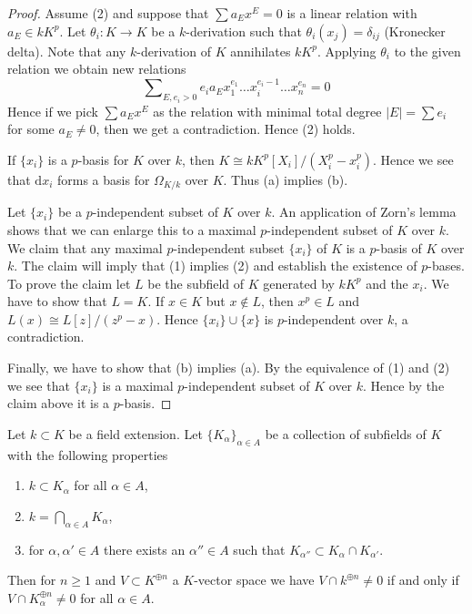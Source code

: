 \begin{proof}
Assume (2) and suppose that $\sum a_E x^E = 0$ is a linear relation
with $a_E \in k K^p$. Let $\theta_i : K \to K$ be a $k$-derivation such that
$\theta_i(x_j) = \delta_{ij}$ (Kronecker delta). Note that any $k$-derivation
of $K$ annihilates $kK^p$. Applying $\theta_i$ to the given relation we
obtain new relations
$$
\sum\nolimits_{E, e_i > 0}
e_i a_E x_1^{e_1}\ldots x_i^{e_i - 1} \ldots x_n^{e_n} = 0
$$
Hence if we pick $\sum a_E x^E$ as the relation with minimal
total degree $|E| = \sum e_i$ for some $a_E \not = 0$, then we
get a contradiction. Hence (2) holds.

\medskip\noindent
If $\{x_i\}$ is a $p$-basis for $K$ over $k$, then
$K \cong kK^p[X_i]/(X_i^p - x_i^p)$. Hence we see that
$\text{d}x_i$ forms a basis for $\Omega_{K/k}$ over $K$.
Thus (a) implies (b).

\medskip\noindent
Let $\{x_i\}$ be a $p$-independent subset of $K$ over $k$. An application
of Zorn's lemma shows that we can enlarge this to a maximal $p$-independent
subset of $K$ over $k$. We claim that any maximal $p$-independent subset
$\{x_i\}$ of $K$ is a $p$-basis of $K$ over $k$. The claim will imply
that (1) implies (2) and establish the existence of $p$-bases.
To prove the claim let $L$ be the subfield of $K$ generated by
$kK^p$ and the $x_i$. We have to show that $L = K$. If $x \in K$
but $x \not \in L$, then $x^p \in L$ and $L(x) \cong L[z]/(z^p - x)$.
Hence $\{x_i\} \cup \{x\}$ is $p$-independent over $k$, a contradiction.

\medskip\noindent
Finally, we have to show that (b) implies (a). By the equivalence of (1)
and (2) we see that $\{x_i\}$ is a maximal $p$-independent subset
of $K$ over $k$. Hence by the claim above it is a $p$-basis.
\end{proof}

\begin{lemma}
\label{lemma-intersection-subfields-subspace}
Let $k \subset K$ be a field extension. Let $\{K_\alpha\}_{\alpha \in A}$
be a collection of subfields of $K$ with the following properties
\begin{enumerate}
\item $k \subset K_\alpha$ for all $\alpha \in A$,
\item $k = \bigcap_{\alpha \in A} K_\alpha$,
\item for $\alpha, \alpha' \in A$ there exists an $\alpha'' \in A$
such that $K_{\alpha''} \subset K_\alpha \cap K_{\alpha'}$.
\end{enumerate}
Then for $n \geq 1$ and $V \subset K^{\oplus n}$ a $K$-vector space
we have $V \cap k^{\oplus n} \not = 0$ if and only if
$V \cap K_\alpha^{\oplus n} \not = 0$ for all $\alpha \in A$.
\end{lemma}

